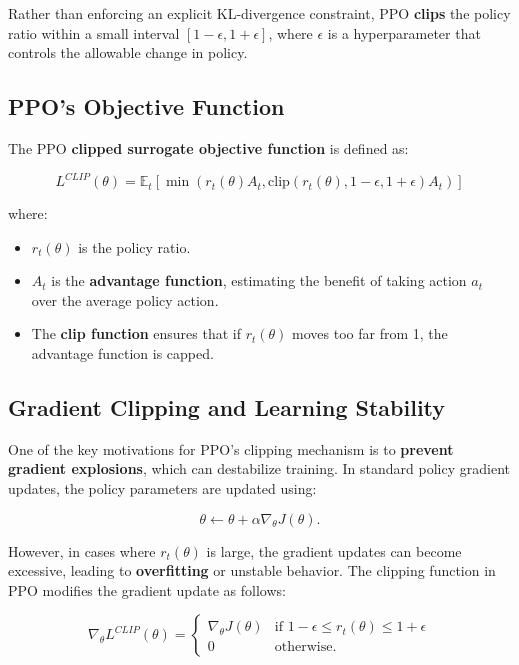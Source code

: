 \documentclass[12pt]{extreport} %
\begin{document}
Rather than enforcing an explicit KL-divergence constraint, PPO \textbf{clips} the policy ratio within a small interval \([1-\epsilon, 1+\epsilon]\), where \( \epsilon \) is a hyperparameter that controls the allowable change in policy.

\subsection{\textbf{PPO's Objective Function}}

The PPO \textbf{clipped surrogate objective function} is defined as:

\begin{equation}
L^{CLIP}(\theta) = \mathbb{E}_t \left[ \min(r_t(\theta) A_t, \text{clip}(r_t(\theta), 1-\epsilon, 1+\epsilon) A_t ) \right]
\end{equation}

where:
\begin{itemize}
    \item \( r_t(\theta) \) is the policy ratio.
    \item \( A_t \) is the \textbf{advantage function}, estimating the benefit of taking action \( a_t \) over the average policy action.
    \item The \textbf{clip function} ensures that if \( r_t(\theta) \) moves too far from 1, the advantage function is capped.
\end{itemize}

\subsection{\textbf{Gradient Clipping and Learning Stability}}

One of the key motivations for PPO's clipping mechanism is to \textbf{prevent gradient explosions}, which can destabilize training. In standard policy gradient updates, the policy parameters are updated using:

\begin{equation}
\theta \leftarrow \theta + \alpha \nabla_\theta J(\theta).
\end{equation}

However, in cases where \( r_t(\theta) \) is large, the gradient updates can become excessive, leading to \textbf{overfitting} or unstable behavior. The clipping function in PPO modifies the gradient update as follows:

\begin{equation}
\nabla_\theta L^{CLIP}(\theta) =
\begin{cases}
\nabla_\theta J(\theta) & \text{if } 1-\epsilon \leq r_t(\theta) \leq 1+\epsilon \\
0 & \text{otherwise}.
\end{cases}
\end{equation}
\end{document}

